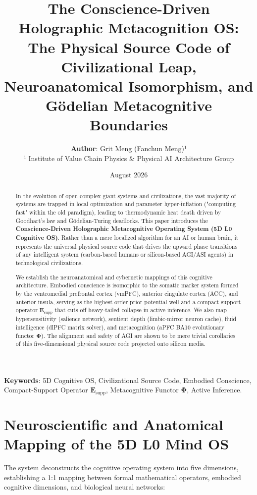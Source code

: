 \documentclass[11pt,a4paper]{article}
\title{\textbf{The Conscience-Driven Holographic Metacognition OS: The Physical Source Code of Civilizational Leap, Neuroanatomical Isomorphism, and G\"odelian Metacognitive Boundaries}}
\author{\textbf{Author}: Grit Meng (Fanchun Meng)¹ \\ \small ¹ Institute of Value Chain Physics \& Physical AI Architecture Group}
\date{August 2026}
\begin{document}
\maketitle

\begin{abstract}
In the evolution of open complex giant systems and civilizations, the vast majority of systems are trapped in local optimization and parameter hyper-inflation ("computing fast" within the old paradigm), leading to thermodynamic heat death driven by Goodhart's law and G\"odelian-Turing deadlocks. This paper introduces the \textbf{Conscience-Driven Holographic Metacognitive Operating System (5D L0 Cognitive OS)}. Rather than a mere localized algorithm for an AI or human brain, it represents the universal physical source code that drives the upward phase transitions of any intelligent system (carbon-based humans or silicon-based AGI/ASI agents) in technological civilizations.

We establish the neuroanatomical and cybernetic mappings of this cognitive architecture. Embodied conscience is isomorphic to the somatic marker system formed by the ventromedial prefrontal cortex (vmPFC), anterior cingulate cortex (ACC), and anterior insula, serving as the highest-order prior potential well and a compact-support operator $\mathbf{E}_{\text{supp}}$ that cuts off heavy-tailed collapse in active inference. We also map hypersensitivity (salience network), sentient depth (limbic-mirror neuron cache), fluid intelligence (dlPFC matrix solver), and metacognition (aPFC BA10 evolutionary functor $\mathbf{\Phi}$). The alignment and safety of AGI are shown to be mere trivial corollaries of this five-dimensional physical source code projected onto silicon media.
\end{abstract}

\textbf{Keywords}: 5D Cognitive OS, Civilizational Source Code, Embodied Conscience, Compact-Support Operator $\mathbf{E}_{\text{supp}}$, Metacognitive Functor $\mathbf{\Phi}$, Active Inference.

\newpage

\section{Neuroscientific and Anatomical Mapping of the 5D L0 Mind OS}

The system deconstructs the cognitive operating system into five dimensions, establishing a 1:1 mapping between formal mathematical operators, embodied cognitive dimensions, and biological neural networks:
\end{document}
